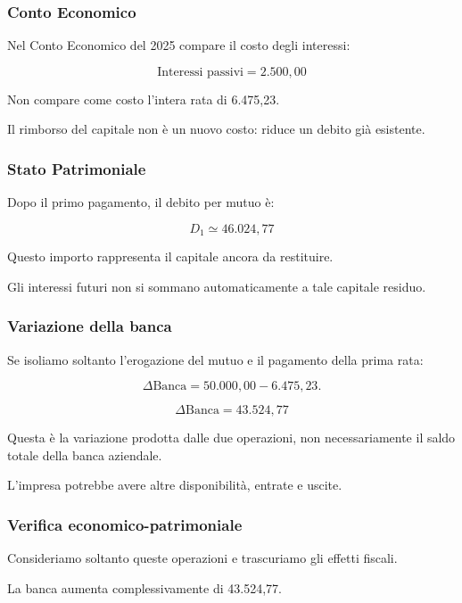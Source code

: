 \subsubsection*{Conto Economico}

\noindent Nel Conto Economico del 2025
compare il costo degli interessi:

\[
\boxed{
\text{Interessi passivi}=2.500{,}00
}
\]

\noindent Non compare come costo
l'intera rata di 6.475,23.

\noindent Il rimborso del capitale
non è un nuovo costo:
riduce un debito già esistente.


\subsubsection*{Stato Patrimoniale}

\noindent Dopo il primo pagamento,
il debito per mutuo è:

\[
\boxed{
D_1\simeq46.024{,}77
}
\]

\noindent Questo importo
rappresenta il capitale
ancora da restituire.

\noindent Gli interessi futuri
non si sommano automaticamente
a tale capitale residuo.


\subsubsection*{Variazione della banca}

\noindent Se isoliamo soltanto
l'erogazione del mutuo
e il pagamento della prima rata:

\[
\Delta\text{Banca}
=
50.000{,}00-6.475{,}23.
\]

\[
\boxed{
\Delta\text{Banca}=43.524{,}77
}
\]

\noindent Questa è la variazione
prodotta dalle due operazioni,
non necessariamente
il saldo totale della banca aziendale.

\noindent L'impresa potrebbe avere
altre disponibilità,
entrate e uscite.


\subsubsection*{Verifica economico-patrimoniale}

\noindent Consideriamo soltanto
queste operazioni
e trascuriamo gli effetti fiscali.

\noindent La banca aumenta
complessivamente di 43.524,77.

